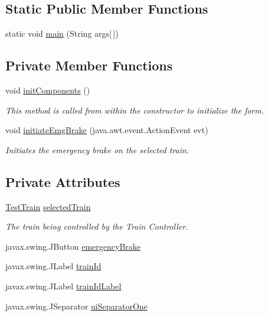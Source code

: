 \subsection*{Static Public Member Functions}
\begin{DoxyCompactItemize}
\item 
static void \hyperlink{classTrainControllerComps_1_1TCPassengerGUI_a65b80b653964f7bd6822a424c78b1a54}{main} (String args\mbox{[}$\,$\mbox{]})
\end{DoxyCompactItemize}
\subsection*{Private Member Functions}
\begin{DoxyCompactItemize}
\item 
void \hyperlink{classTrainControllerComps_1_1TCPassengerGUI_a0470c9528fe420297061ed084b92e7c4}{init\+Components} ()
\begin{DoxyCompactList}\small\item\em This method is called from within the constructor to initialize the form. \end{DoxyCompactList}\item 
void \hyperlink{classTrainControllerComps_1_1TCPassengerGUI_a41e6c77f96e89bb0b247668cc426f522}{initiate\+Emg\+Brake} (java.\+awt.\+event.\+Action\+Event evt)
\begin{DoxyCompactList}\small\item\em Initiates the emergency brake on the selected train. \end{DoxyCompactList}\end{DoxyCompactItemize}
\subsection*{Private Attributes}
\begin{DoxyCompactItemize}
\item 
\hyperlink{classTrainControllerComps_1_1TestTrain}{Test\+Train} \hyperlink{classTrainControllerComps_1_1TCPassengerGUI_afcf53b411242f019ef96ef8e593f5b6a}{selected\+Train}
\begin{DoxyCompactList}\small\item\em The train being controlled by the Train Controller. \end{DoxyCompactList}\item 
javax.\+swing.\+J\+Button \hyperlink{classTrainControllerComps_1_1TCPassengerGUI_a45d3019b50112c727dbd12233ba3a822}{emergency\+Brake}
\item 
javax.\+swing.\+J\+Label \hyperlink{classTrainControllerComps_1_1TCPassengerGUI_a986818d54895ef1956c5ee655e3c7637}{train\+Id}
\item 
javax.\+swing.\+J\+Label \hyperlink{classTrainControllerComps_1_1TCPassengerGUI_ad919d2752a791d156963ddff49886595}{train\+Id\+Label}
\item 
javax.\+swing.\+J\+Separator \hyperlink{classTrainControllerComps_1_1TCPassengerGUI_ac8aa2c896b5f794013cedb4c3f07c5b3}{ui\+Separator\+One}
\end{DoxyCompactItemize}


